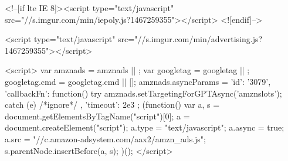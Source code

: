     <!--[if lte IE 8]><script type="text/javascript" src="//s.imgur.com/min/iepoly.js?1467259355"></script>
<![endif]-->
    

                        <script type="text/javascript" src="//s.imgur.com/min/advertising.js?1467259355"></script>

<script>
    var amznads = amznads || { };
    var googletag = googletag || { };
    googletag.cmd = googletag.cmd || [];
    amznads.asyncParams = {
        'id': '3079',
        'callbackFn': function() {
            try {
                amznads.setTargetingForGPTAsync('amznslots');
            } catch (e) { /*ignore*/ }
        },
        'timeout': 2e3
    };
    (function() {
        var a, s = document.getElementsByTagName("script")[0];
        a = document.createElement("script");
        a.type = "text/javascript";
        a.async = true;
        a.src = "//c.amazon-adsystem.com/aax2/amzn_ads.js";
        s.parentNode.insertBefore(a, s);
    })();
</script>

